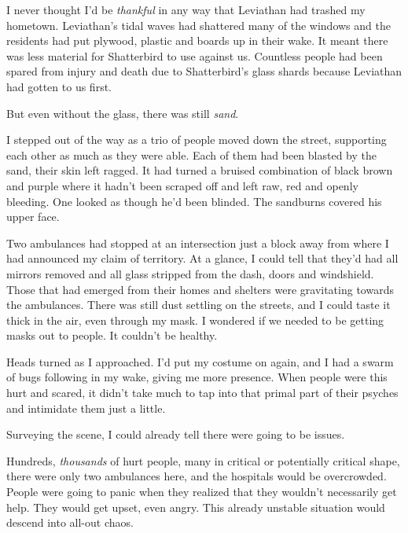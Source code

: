 





I never thought I'd be \emph{thankful} in any way that Leviathan had trashed my hometown.  Leviathan's tidal waves had shattered many of the windows and the residents had put plywood, plastic and boards up in their wake.  It meant there was less material for Shatterbird to use against us.  Countless people had been spared from injury and death due to Shatterbird's glass shards because Leviathan had gotten to us first.



But even without the glass, there was still \emph{sand}.



I stepped out of the way as a trio of people moved down the street, supporting each other as much as they were able.  Each of them had been blasted by the sand, their skin left ragged.  It had turned a bruised combination of black brown and purple where it hadn't been scraped off and left raw, red and openly bleeding.  One looked as though he'd been blinded.  The sandburns covered his upper face.



Two ambulances had stopped at an intersection just a block away from where I had announced my claim of territory.  At a glance, I could tell that they'd had all mirrors removed and all glass stripped from the dash, doors and windshield.  Those that had emerged from their homes and shelters were gravitating towards the ambulances.  There was still dust settling on the streets, and I could taste it thick in the air, even through my mask.  I wondered if we needed to be getting masks out to people.  It couldn't be healthy.



Heads turned as I approached.  I'd put my costume on again, and I had a swarm of bugs following in my wake, giving me more presence.  When people were this hurt and scared, it didn't take much to tap into that primal part of their psyches and intimidate them just a little.



Surveying the scene, I could already tell there were going to be issues.



Hundreds, \emph{thousands} of hurt people, many in critical or potentially critical shape, there were only two ambulances here, and the hospitals would be overcrowded.  People were going to panic when they realized that they wouldn't necessarily get help.  They would get upset, even angry.  This already unstable situation would descend into all-out chaos.



